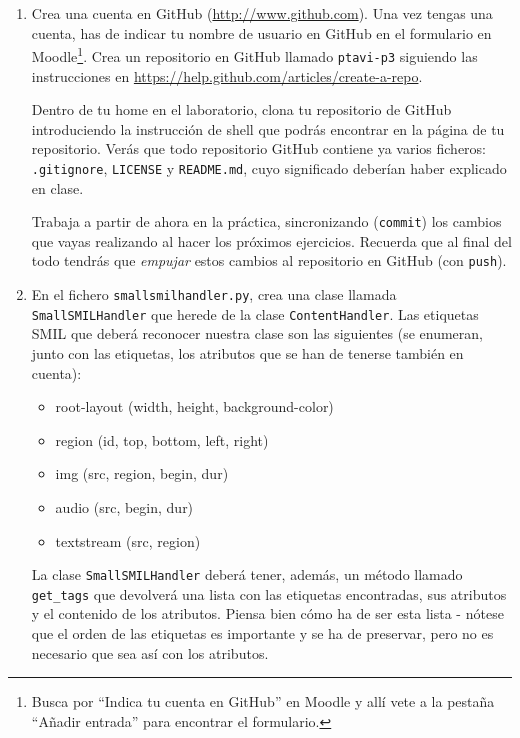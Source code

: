 \documentclass[11pt,a4paper]{article}
\newcommand{\finejercicio}{
  \begin{footnotesize}
    [Al terminar el ejercicio es recomendable hacer \texttt{commit} de los ficheros modificados]
  \end{footnotesize}
}
\begin{document}
\begin{enumerate}

  \item Crea una cuenta en GitHub (\url{http://www.github.com}). Una vez tengas una cuenta, has de indicar tu nombre de usuario en GitHub en el formulario en Moodle\footnote{Busca por ``Indica tu cuenta en GitHub'' en Moodle y allí vete a la pestaña ``Añadir entrada'' para encontrar el formulario.}. Crea un repositorio en GitHub llamado \texttt{ptavi-p3} siguiendo las instrucciones en \url{https://help.github.com/articles/create-a-repo}.

  Dentro de tu home en el laboratorio, clona tu repositorio de GitHub introduciendo la instrucción de shell que podrás encontrar en la página de tu repositorio. Verás que todo repositorio GitHub contiene ya varios ficheros: \texttt{.gitignore}, \texttt{LICENSE}
y \texttt{README.md}, cuyo significado deberían haber explicado en clase.

  Trabaja a partir de ahora en la práctica, sincronizando (\texttt{commit}) los cambios que vayas realizando al hacer los próximos ejercicios. Recuerda que al final del todo tendrás que \emph{empujar} estos cambios al repositorio en GitHub (con \texttt{push}).


  \item En el fichero \texttt{smallsmilhandler.py}, crea una clase llamada \texttt{SmallSMILHandler} que herede de la clase \texttt{ContentHandler}. Las etiquetas SMIL que deberá reconocer nuestra clase son las siguientes (se enumeran, junto con las etiquetas, los atributos que se han de tenerse también en cuenta):
  \begin{itemize}
    \item root-layout (width, height, background-color)
    \item region (id, top, bottom, left, right)
    \item img (src, region, begin, dur)
    \item audio (src, begin, dur)
    \item textstream (src, region)
  \end{itemize}
	La clase \texttt{SmallSMILHandler} deberá tener, además, un método llamado \texttt{get\_tags} que devolverá una lista con las etiquetas encontradas, sus atributos y el contenido de los atributos. Piensa bien cómo ha de ser esta lista  - nótese que el orden de las etiquetas es importante y se ha de preservar, pero no es necesario que sea así con los atributos.


\end{enumerate}
\end{document}
